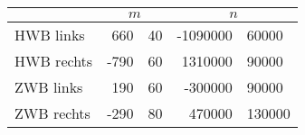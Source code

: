\label{tab:geraden1}
	\begin{tabular}{lr@{${}\pm{}$}lr@{${}\pm{}$}l}
		\toprule
		{} & \multicolumn{2}{c}{$m$} & \multicolumn{2}{c}{$n$} \\
		\midrule
		{HWB links}  &  660 & 40 & -1090000 &  60000 \\
		{HWB rechts} & -790 & 60 &  1310000 &  90000 \\
		{ZWB links}  &  190 & 60 &  -300000 &  90000 \\
		{ZWB rechts} & -290 & 80 &   470000 & 130000 \\
		\bottomrule
	\end{tabular}
